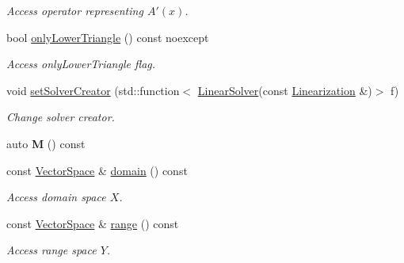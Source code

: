 \begin{DoxyCompactItemize}
\begin{DoxyCompactList}\small\item\em Access operator representing $A'(x)$. \end{DoxyCompactList}\item 
bool \hyperlink{classSpacy_1_1Kaskade_1_1DynamicC1Operator_a790124ad6b035750e819cdc0718e9af3}{only\+Lower\+Triangle} () const noexcept
\begin{DoxyCompactList}\small\item\em Access only\+Lower\+Triangle flag. \end{DoxyCompactList}\item 
void \hyperlink{classSpacy_1_1Kaskade_1_1DynamicC1Operator_a4a440be1a20133c2d7cb8c6382656172}{set\+Solver\+Creator} (std\+::function$<$ \hyperlink{namespaceSpacy_adcd0d78166a9c972b8a2e5a689fc2d03}{Linear\+Solver}(const \hyperlink{classSpacy_1_1Kaskade_1_1LinearOperator}{Linearization} \&)$>$ f)
\begin{DoxyCompactList}\small\item\em Change solver creator. \end{DoxyCompactList}\item 
auto {\bfseries M} () const \hypertarget{classSpacy_1_1Kaskade_1_1DynamicC1Operator_a197de5e4e1bfbdd4759be55afcdb8090}{}\label{classSpacy_1_1Kaskade_1_1DynamicC1Operator_a197de5e4e1bfbdd4759be55afcdb8090}

\item 
const \hyperlink{classSpacy_1_1VectorSpace}{Vector\+Space} \& \hyperlink{classSpacy_1_1OperatorBase_a2588f9b3e0188820c4c494e63293dc6f}{domain} () const \hypertarget{classSpacy_1_1OperatorBase_a2588f9b3e0188820c4c494e63293dc6f}{}\label{classSpacy_1_1OperatorBase_a2588f9b3e0188820c4c494e63293dc6f}

\begin{DoxyCompactList}\small\item\em Access domain space $X$. \end{DoxyCompactList}\item 
const \hyperlink{classSpacy_1_1VectorSpace}{Vector\+Space} \& \hyperlink{classSpacy_1_1OperatorBase_ab19d3b7a6f290b1079248f1e567e53d6}{range} () const \hypertarget{classSpacy_1_1OperatorBase_ab19d3b7a6f290b1079248f1e567e53d6}{}\label{classSpacy_1_1OperatorBase_ab19d3b7a6f290b1079248f1e567e53d6}

\begin{DoxyCompactList}\small\item\em Access range space $Y$. \end{DoxyCompactList}\end{DoxyCompactItemize}


